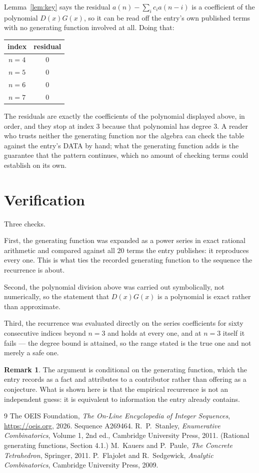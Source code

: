 \documentclass[11pt,a4paper]{article}
\theoremstyle{plain}
\theoremstyle{definition}
\newtheorem{remark}[theorem]{Remark}
\begin{document}
Lemma~\ref{lem:key} says the residual $a(n)-\sum_ic_ia(n-i)$ is a coefficient of the
polynomial $D(x)G(x)$, so it can be read off the entry's own published terms with no
generating function involved at all. Doing that:
\begin{center}
\begin{tabular}{cc}
index & residual \\ \hline
$n=4$ & $0$ \\
$n=5$ & $0$ \\
$n=6$ & $0$ \\
$n=7$ & $0$
\end{tabular}
\end{center}
The residuals are exactly the coefficients of the polynomial displayed above, in order, and
they stop at index $3$ because that polynomial has degree $3$. A reader who trusts
neither the generating function nor the algebra can check the table against the entry's DATA
by hand; what the generating function adds is the guarantee that the pattern continues, which
no amount of checking terms could establish on its own.

\section{Verification}

Three checks.

First, the generating function was expanded as a power series in exact rational arithmetic and
compared against all $20$ terms the entry publishes: it reproduces every one. This is
what ties the recorded generating function to the sequence the recurrence is about.

Second, the polynomial division above was carried out symbolically, not numerically, so the
statement that $D(x)G(x)$ is a polynomial is exact rather than approximate.

Third, the recurrence was evaluated directly on the series coefficients for sixty consecutive
indices beyond $n=3$ and holds at every one, and at $n=3$ itself it fails --- the
degree bound is attained, so the range stated is the true one and not merely a safe one.

\begin{remark}
The argument is conditional on the generating function, which the entry records as a fact and
attributes to a contributor rather than offering as a conjecture. What is shown here is that
the empirical recurrence is not an independent guess: it is equivalent to information the
entry already contains.
\end{remark}

\begin{thebibliography}{9}
 The OEIS Foundation, \emph{The On-Line Encyclopedia of Integer
Sequences}, \url{https://oeis.org}, 2026. Sequence A269464.
 R.~P.~Stanley, \emph{Enumerative Combinatorics}, Volume 1, 2nd ed.,
Cambridge University Press, 2011. (Rational generating functions, Section 4.1.)
 M.~Kauers and P.~Paule, \emph{The Concrete Tetrahedron}, Springer, 2011.
 P.~Flajolet and R.~Sedgewick, \emph{Analytic Combinatorics}, Cambridge
University Press, 2009.
\end{thebibliography}
\end{document}
